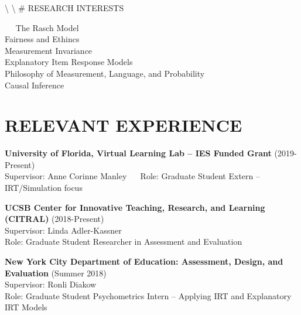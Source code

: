 \documentclass[11pt,]{article}
\begin{document}
\textbackslash{} \textbackslash{} \# RESEARCH INTERESTS

~~ The Rasch Model\\
\hspace*{0.333em}\hspace*{0.333em} Fairness and Ethincs\\
\hspace*{0.333em}\hspace*{0.333em} Measurement Invariance\\
\hspace*{0.333em}\hspace*{0.333em} Explanatory Item Response Models\\
\hspace*{0.333em}\hspace*{0.333em} Philosophy of Measurement, Language,
and Probability\\
\hspace*{0.333em}\hspace*{0.333em} Causal Inference

\hypertarget{relevant-experience}{%
\section{RELEVANT EXPERIENCE}\label{relevant-experience}}

\textbf{University of Florida, Virtual Learning Lab -- IES Funded Grant}
(2019-Present)\\
\hspace*{0.333em}\hspace*{0.333em} Supervisor: Anne Corinne Manley ~~
Role: Graduate Student Extern -- IRT/Simulation focus

\textbf{UCSB Center for Innovative Teaching, Research, and Learning
(CITRAL)} (2018-Present)\\
\hspace*{0.333em}\hspace*{0.333em} Supervisor: Linda Adler-Kassner\\
\hspace*{0.333em}\hspace*{0.333em} Role: Graduate Student Researcher in
Assessment and Evaluation

\textbf{New York City Department of Education: Assessment, Design, and
Evaluation} (Summer 2018)\\
\hspace*{0.333em}\hspace*{0.333em} Supervisor: Ronli Diakow\\
\hspace*{0.333em}\hspace*{0.333em} Role: Graduate Student Psychometrics
Intern -- Applying IRT and Explanatory IRT Models
\end{document}
